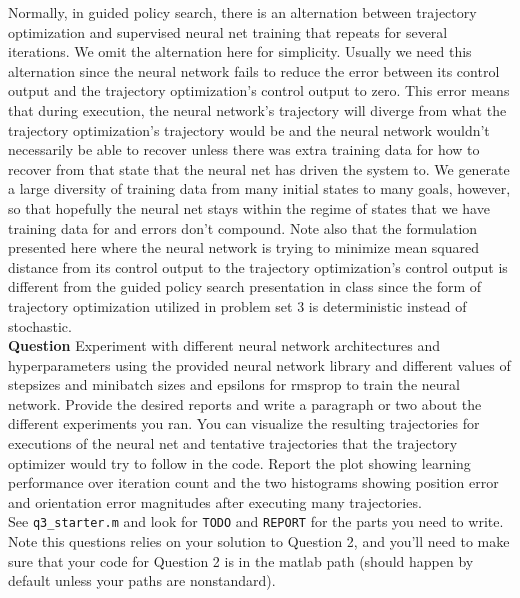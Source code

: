 \documentclass{article}
\begin{document}
Normally, in guided policy search, there is an alternation between trajectory optimization and supervised neural net training that repeats for several iterations.
We omit the alternation here for simplicity.
Usually we need this alternation since the neural network fails to reduce the error between its control output and the trajectory optimization's control output to zero.
This error means that during execution, the neural network's trajectory will diverge from what the trajectory optimization's trajectory would be and the neural network 
wouldn't necessarily be able to recover unless there was extra training data for how to recover from that state that the neural net has driven the system to.
We generate a large diversity of training data from many initial states to many goals, however, so that hopefully the neural net stays within the regime of states that we have training data for
and errors don't compound.
Note also that the formulation presented here where the neural network is trying to minimize mean squared distance from its control output to the trajectory optimization's control output is 
different from the guided policy search presentation in class since the form of trajectory optimization utilized in problem set 3 is deterministic instead of stochastic.
\\

{\bf Question} Experiment with different neural network architectures and hyperparameters using the provided neural network library and different values of stepsizes 
and minibatch sizes and epsilons for rmsprop to train the neural network.
Provide the desired reports and write a paragraph or two about the different experiments you ran.
You can visualize the resulting trajectories for executions of the neural net and tentative trajectories that the trajectory optimizer would try to follow in the code.
Report the plot showing learning performance over iteration count and the two histograms showing position error and orientation error magnitudes after executing many trajectories.
\\

See \verb|q3_starter.m| and look for \verb|TODO| and \verb|REPORT| for the parts you need to write.
Note this questions relies on your solution to Question 2, and you'll need to make sure that your code for Question 2 is in the matlab path (should happen by default unless your paths are nonstandard).




\end{document}
